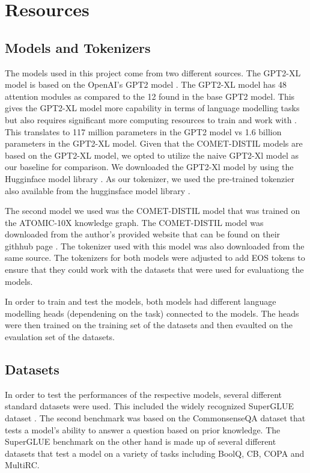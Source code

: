 \documentclass[\main/thesis.tex]{subfiles}
\begin{document}
\chapter{Resources}\label{sec:resources} 


\section{Models and Tokenizers}\label{sec:models}
The models used in this project come from two different sources. The GPT2-XL model is based on the OpenAI's GPT2 model \cite{radford_language_nodate}. 
The GPT2-XL model has 48 attention modules as compared to the 12 found in the base GPT2 model. This gives the GPT2-XL model more capability 
in terms of language modelling tasks but also requires significant more computing resources to train and work with \cite{noauthor_pretrained_nodate}. 
This translates to 117 million parameters in the GPT2 model vs 1.6 billion parameters in the GPT2-XL model. Given that the COMET-DISTIL models are 
based on the GPT2-XL model, we opted to utilize the naive GPT2-Xl model as our baseline for comparison. We downloaded the GPT2-Xl model by 
using the Hugginface model library \cite{noauthor_gpt2-xl_nodate}. As our tokenizer, we used the pre-trained tokenzier also available from 
the hugginsface model library \cite{noauthor_gpt2-xl_nodate}. 

The second model we used was the COMET-DISTIL model \cite{west_symbolic_2021} that was trained on the ATOMIC-10X knowledge graph. The COMET-DISTIL 
model was downloaded from the author's provided website that can be found on their githhub page \cite{peterwestai2_symbolic_2022}. The tokenizer used
with this model was also downloaded from the same source. The tokenizers for both models were adjusted to add EOS tokens to ensure that they could work 
with the datasets that were used for evaluationg the models. 

In order to train and test the models, both models had different language modelling heads (dependening on the task) connected
to the models. The heads were then trained on the training set of the datasets and then evaulted on 
the evaulation set of the datasets. 

\section{Datasets}\label{sec:datasets}
In order to test the performances of the respective models, several different standard datasets were used. This included the widely
recognized SuperGLUE dataset \cite{wang_superglue_nodate}. The second benchmark was based on the CommonsenseQA dataset \cite{talmor_commonsenseqa_2018} 
that tests a model's ability to answer a question based on prior knowledge. The SuperGLUE benchmark on the other hand is made up of several different datasets
that test a model on a variety of tasks including BoolQ, CB, COPA and MultiRC. 
\end{document}
